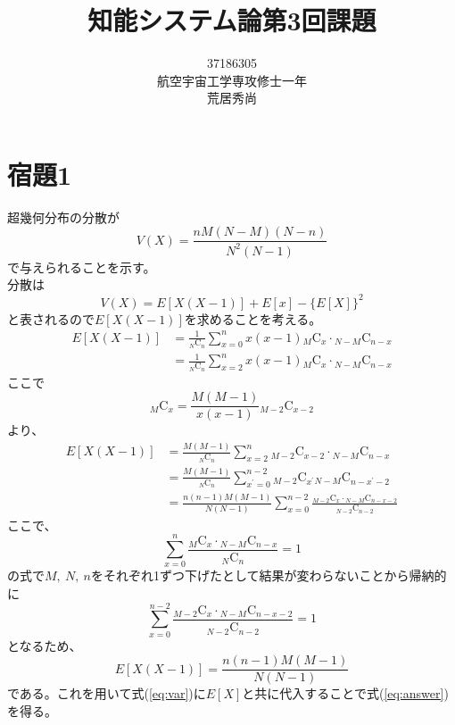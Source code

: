 \documentclass[10pt,a4paper]{ltjsarticle}       %
\title{知能システム論第3回課題}
\author{37186305\\航空宇宙工学専攻修士一年\\荒居秀尚}
\begin{document}
\maketitle

\section{宿題1}
超幾何分布の分散が
\begin{equation}
  V(X) = \frac{nM(N-M)(N-n)}{N^2 (N-1)}
  \label{eq:answer}
\end{equation}
で与えられることを示す。\\

分散は
\begin{equation}
  V(X) = E[X(X-1)] + E[x] - \{E[X]\}^2
  \label{eq:var}
\end{equation}
と表されるので$E[X(X-1)]$を求めることを考える。
\begin{align}
E[X(X-1)] &= \frac{1}{{}_N\mathrm{C}_n}\sum_{x=0}^n x (x-1) {}_M\mathrm{C}_x \cdot {}_{N-M}\mathrm{C}_{n-x} \\
               &= \frac{1}{{}_N\mathrm{C}_n}\sum_{x=2}^n x(x-1) {}_M\mathrm{C}_x \cdot {}_{N-M}\mathrm{C}_{n-x}
\end{align}
ここで
\begin{equation}
{}_M\mathrm{C}_{x} = \frac{M(M-1)}{x(x-1)}{}_{M-2}\mathrm{C}_{x-2}
\end{equation}
より、
\begin{align}
E[X(X-1)] &= \frac{M(M-1)}{{}_N\mathrm{C}_{n}} \sum_{x=2}^n {}_{M-2}\mathrm{C}_{x-2} \cdot {}_{N-M}\mathrm{C}_{n-x} \\ 
               &= \frac{M(M-1)}{{}_N\mathrm{C}_n} \sum_{x^{\prime}=0}^{n-2} {}_{M-2}\mathrm{C}_{x^{\prime}} {}_{N-M}\mathrm{C}_{n-x^{\prime}-2} \\
               &= \frac{n(n-1)M(M-1)}{N(N-1)}\sum_{x=0}^{n-2}\frac{{}_{M-2}\mathrm{C}_x \cdot {}_{N-M}\mathrm{C}_{n-x-2}}{{}_{N-2}\mathrm{C}_{n-2}}
\end{align}
ここで、
\begin{equation}
  \sum_{x=0}^n \frac{{}_M\mathrm{C}_x \cdot {}_{N-M}\mathrm{C}_{n-x}}{{}_N\mathrm{C}_n} = 1
\end{equation}
の式で$M,~N,~n$をそれぞれ1ずつ下げたとして結果が変わらないことから帰納的に
\begin{equation}
  \sum_{x=0}^{n-2}\frac{{}_{M-2}\mathrm{C}_x \cdot {}_{N-M}\mathrm{C}_{n-x-2}}{{}_{N-2}\mathrm{C}_{n-2}} = 1
\end{equation}
となるため、
\begin{equation}
E[X(X-1)] = \frac{n(n-1)M(M-1)}{N(N-1)}
\end{equation}
である。これを用いて式(\ref{eq:var})に$E[X]$と共に代入することで式(\ref{eq:answer})を得る。
\end{document}
